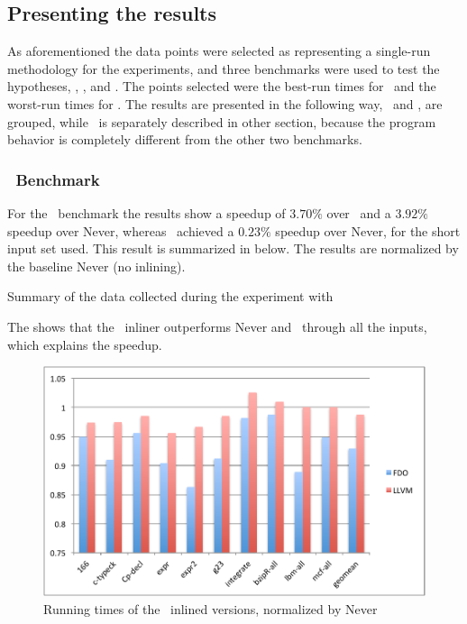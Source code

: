 
\subsection{Presenting the results}

As aforementioned the data points were selected as representing a single-run methodology for the experiments, and three benchmarks were used to test the hypotheses, \bzip, \gzip, and \gcc. The points selected were the best-run times for \FDI\ and the worst-run times for \llvm. The results are presented in the following way, \bzip\ and \gzip, are grouped, while \gcc\ is separately described in other section, because the program behavior is completely different from the other two benchmarks.

\subsubsection{\Gcc\ Benchmark}

For the \gcc\ benchmark the results show a speedup of $3.70 \%$ over \llvm\, and a $3.92 \%$ speedup over Never, whereas \llvm\ achieved a $0.23 \%$ speedup over Never, for the short input set used. This result is summarized in  below. The results are normalized by the baseline Never (no inlining).

\begin{table}
  \centering
  \begin{tiny}
  
  \end{tiny}
  \caption{Summary of the data collected during the experiment with \gcc}
  \label{tab:speedupgcc}
\end{table}

The  shows that the \FDI\ inliner outperforms Never and \llvm\ through all the inputs, which explains the speedup.

\begin{figure}
  \centering
  \includegraphics[width=1.00\linewidth]{Figures/speedupgcc}
  \caption{Running times of the \gcc\ inlined versions, normalized by Never}
  \label{fig:speedupgcc}
\end{figure}

